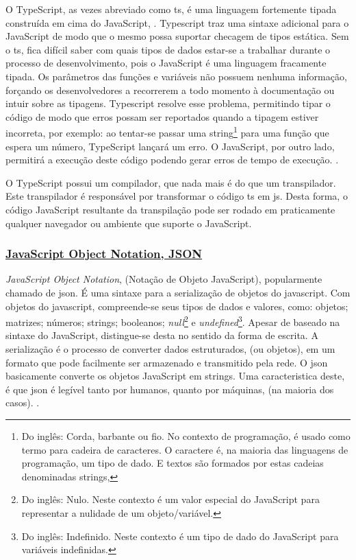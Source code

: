 O TypeScript, as vezes abreviado como
\acrshort{ts}, é uma linguagem fortemente
tipada construída em cima do JavaScript,
\cite{ts-page}.
Typescript traz uma sintaxe adicional para o JavaScript de modo
que o mesmo possa suportar checagem de tipos estática.
Sem o \acrshort{ts},
fica difícil saber com quais tipos de dados estar-se a trabalhar
durante o processo de desenvolvimento, pois o JavaScript é uma
linguagem fracamente tipada. Os parâmetros das funções e variáveis
não possuem nenhuma informação, forçando os desenvolvedores
a recorrerem a todo momento à documentação ou intuir sobre
as tipagens.
Typescript resolve esse problema, permitindo tipar o código
de modo que erros possam ser reportados quando a tipagem estiver
incorreta, por exemplo: ao tentar-se passar uma
string\footnote{Do inglês: Corda, barbante ou fio. No contexto de programação,
    é usado como termo para cadeira de caracteres. O caractere é, na
    maioria das linguagens de programação, um tipo de dado. E textos
    são formados por estas cadeias denominadas strings,
}
para uma função que espera um número, TypeScript lançará um erro.
O JavaScript, por outro lado, permitirá a execução deste código
podendo gerar erros de tempo de execução.
\cite{ts-w3}.

O TypeScript possui um compilador, que nada mais é do que um
transpilador. Este transpilador é responsável por transformar o
código
\acrshort{ts} em
\acrshort{js}.
Desta forma, o código JavaScript resultante da
transpilação pode ser rodado em praticamente qualquer
navegador ou ambiente que suporte o JavaScript.

\subsubsection{\underline{JavaScript Object Notation, JSON}}

\textit{JavaScript Object Notation}, (Notação de Objeto JavaScript),
popularmente chamado de \acrshort{json}. É uma sintaxe para a serialização de
objetos do javascript. Com objetos do javascript, compreende-se seus tipos
de dados e valores, como: objetos; matrizes; números; strings; booleanos;
\textit{null}\footnote{Do inglês: Nulo. Neste contexto é um valor especial do JavaScript para
    representar a nulidade de um objeto/variável.
}
e
\textit{undefined}\footnote{Do inglês: Indefinido. Neste contexto é um tipo de dado do JavaScript
    para variáveis indefinidas.
}.
Apesar de baseado na sintaxe do JavaScript, distingue-se desta
no sentido da forma de escrita. A serialização é o processo
de converter dados estruturados, (ou objetos), em um formato que pode
facilmente ser armazenado e transmitido pela rede. O \acrshort{json}
basicamente converte os objetos JavaScript em strings. Uma caracteristica deste,
é que \acrshort{json} é legível tanto por humanos, quanto por máquinas,
(na maioria dos casos).
\cite{mdn-json}.

